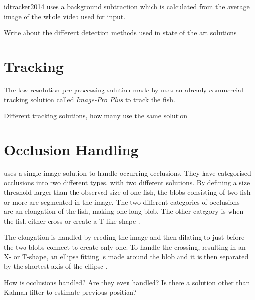 \gls{idtracker2014} uses a background subtraction which is calculated from the average image of the whole video used for input.


Write about the  different detection methods used in state of the art solutions


\section{Tracking}
The low resolution pre processing solution made by \cite{Dolado2015} uses an already commercial tracking solution called \textit{Image-Pro Plus} to track the fish.


Different tracking solutions, how many use the same solution

\section{Occlusion Handling}
\cite{Dolado2015} uses a single image solution to handle occurring occlusions. They have categorised occlusions into two different types, with two different solutions. By defining a size threshold larger than the observed size of one fish, the \gls{blob}s consisting of two fish or more are segmented in the image. The two different categories of occlusions are an elongation of the fish, making one long \gls{blob}. The other category is when the fish either cross or create a T-like shape \citep{Dolado2015}.

The elongation is handled by eroding the image and then dilating to just before the two \gls{blob}s connect to create only one. To handle the crossing, resulting in an X- or T-shape, an ellipse fitting is made around the \gls{blob} and it is then separated by the shortest axis of the ellipse \citep{Dolado2015}.


How is occlusions handled? Are they even handled? Is there a solution other than Kalman filter to estimate previous position?